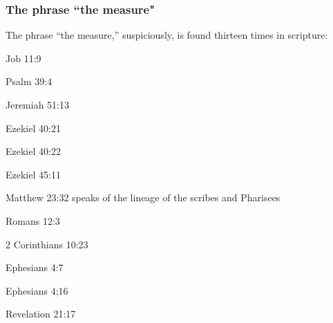 \subsubsection{The phrase ``the measure"}

The phrase ``the measure,'' suspiciously, is found thirteen times in scripture:

\begin{compactenum}
    \item Job  11:9
    \item Psalm 39:4
    \item Jeremiah 51:13
    \item Ezekiel 40:21
    \item Ezekiel 40:22
    \item Ezekiel 45:11
    \item Matthew 23:32 speaks of the lineage of the scribes and Pharisees
    \item Romans 12:3
    \item 2 Corinthians  10:23
    \item Ephesians 4:7
    \item Ephesians 4;16
    \item Revelation 21:17
\end{compactenum}
